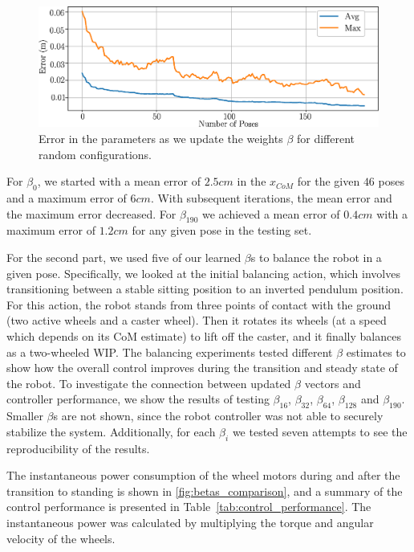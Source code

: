 \documentclass[letterpaper, 10 pt, conference]{ieeeconf}  %
\begin{document}
\begin{figure}
\centering
\includegraphics[width=0.9\columnwidth]{figs/TestingHardware.eps}
\vspace{-0.2cm}
\caption{\label{fig:Error_hardware} Error in the parameters as we update the weights $\beta$ for different random configurations.}
\end{figure}
For $\beta_0$, we started with a mean error of $2.5 cm$ in the $x_{CoM}$ for the given $46$ poses and a maximum error of $6 cm$. With subsequent iterations, the mean error and the maximum error decreased. For $\beta_{190}$ we achieved a mean error of $0.4 cm$ with a maximum error of $1.2 cm$ for any given pose in the testing set.

For the second part, we used five of our learned $\beta$s to balance the robot in a given pose.  Specifically, we looked at the initial balancing action, which involves transitioning between a stable sitting position to an inverted pendulum position. For this action, the robot stands from three points of contact with the ground (two active wheels and a caster wheel). Then it rotates its wheels (at a speed which depends on its \ac{CoM} estimate) to lift off the caster, and it finally balances as a two-wheeled \ac{WIP}.
The balancing experiments tested different $\beta$ estimates to show how the overall control improves during the transition and steady state of the robot.
To investigate the connection between updated $\beta$ vectors and controller performance, we show the results of testing $\beta_{16}$, $\beta_{32}$, $\beta_{64}$, $\beta_{128}$ and $\beta_{190}$.  Smaller $\beta$s are not shown, since the robot controller was not able to securely stabilize the system.  Additionally, for each $\beta_i$ we tested seven attempts to see the reproducibility of the results.

The instantaneous power consumption of the wheel motors during and after the transition to standing is shown in \cref{fig:betas_comparison}, and a summary of the control performance is presented in Table~\ref{tab:control_performance}.  The instantaneous power was calculated by multiplying the torque and angular velocity of the wheels.
\end{document}
